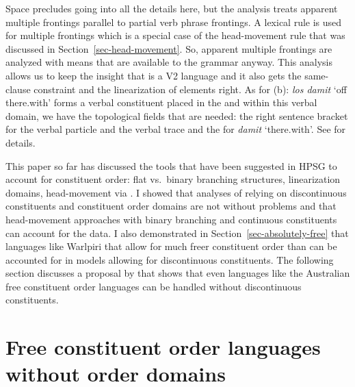 \documentclass[output=paper]{langsci/langscibook}
\begin{document}
\zl 
Space precludes going into all the details here, but the analysis treats apparent multiple frontings parallel to
partial verb phrase frontings. A lexical rule is used for multiple frontings which is a special case
of the head-movement rule that was discussed in Section~\ref{sec-head-movement}. So, apparent
multiple frontings are analyzed with means that are available to the grammar anyway. This analysis
allows us to keep the insight that  is a V2 language and it also gets the same-clause constraint
and the linearization of elements right. As for (b): \emph{los damit} `off there.with' forms
a verbal constituent placed in the \vf and within this verbal domain, we have the topological fields that are needed:
the right sentence bracket for the verbal particle and the verbal trace and the \nf for
\emph{damit} `there.with'. See  for details.




This paper so far has discussed the tools that have been suggested in HPSG to account for constituent
order: flat vs.\ binary branching structures, linearization domains, head-movement via \dsl. I
showed that analyses of  relying on discontinuous constituents and constituent order domains
are not without problems and that head-movement approaches with binary branching and continuous
constituents can account for the data. I also demonstrated in Section~\ref{sec-absolutely-free} that
languages like Warlpiri that allow for much freer constituent order than  can be accounted
for in models allowing for discontinuous constituents. The following section discusses a proposal by \citet{Bender2008a} that shows that even
languages like the Australian free constituent order languages can be handled without discontinuous constituents.

\section{Free constituent order languages without order domains}
\label{sec-free-without-domains}
\end{document}
